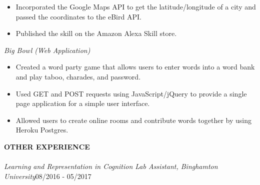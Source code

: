 \documentclass[10.5pt]{res}
\newcommand{\sectionSpace}{\vspace{-3pt}}
\newcommand{\itemSpace}{\vspace{-8pt}}
\begin{document}
\begin{resume}
\begin{itemize}
 	\item Incorporated the Google Maps API to get the latitude/longitude of a city and passed the coordinates to the eBird API.
	\item Published the skill on the Amazon Alexa Skill store.
	\end{itemize}
	\itemSpace
{\it Big Bowl (Web Application)}\\ [-11pt]  
	\begin{itemize} \itemsep -1pt %
	\item Created a word party game that allows users to enter words into a word bank and play taboo, charades, and password.
 	\item Used GET and POST requests using JavaScript/jQuery to provide a single page application for a simple user interface.
	\item Allowed users to create online rooms and contribute words together by using Heroku Postgres.
	\end{itemize}
	\sectionSpace

\textbf{OTHER EXPERIENCE} \\ [-10.5pt]
\noindent\makebox[\linewidth]{\rule{\textwidth}{0.4pt}}\\
{\it Learning and Representation in Cognition Lab Assistant, Binghamton University}\hfill 08/2016 - 05/2017 \\ [-11pt]
\end{resume}
\end{document}
